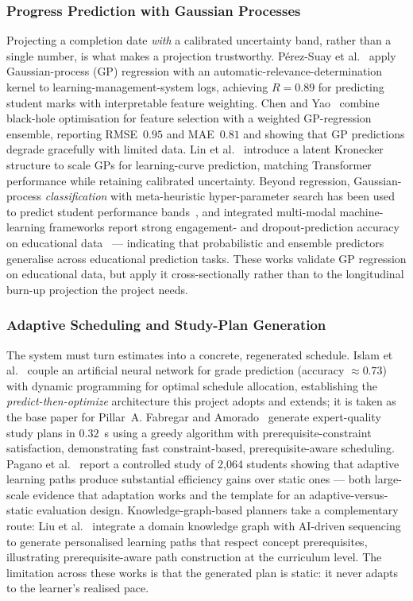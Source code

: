 \documentclass[12pt]{report}
\begin{document}
\subsubsection{Progress Prediction with Gaussian Processes}
Projecting a completion date \emph{with} a calibrated uncertainty band, rather than a
single number, is what makes a projection trustworthy. P\'erez-Suay et
al.~\cite{perezsuay2024} apply Gaussian-process (GP) regression with an
automatic-relevance-determination kernel to learning-management-system logs, achieving
$R = 0.89$ for predicting student marks with interpretable feature weighting. Chen and
Yao~\cite{chenyao2025} combine black-hole optimisation for feature selection with a
weighted GP-regression ensemble, reporting RMSE~$0.95$ and MAE~$0.81$ and showing that GP
predictions degrade gracefully with limited data. Lin et al.~\cite{lin2024} introduce a
latent Kronecker structure to scale GPs for learning-curve prediction, matching
Transformer performance while retaining calibrated uncertainty. Beyond regression,
Gaussian-process \emph{classification} with meta-heuristic hyper-parameter search has been
used to predict student performance bands~\cite{huang2025}, and integrated multi-modal
machine-learning frameworks report strong engagement- and dropout-prediction accuracy on
educational data~\cite{kayande2025} --- indicating that probabilistic and ensemble
predictors generalise across educational prediction tasks. These works validate GP
regression on educational data, but apply it cross-sectionally rather than to the
longitudinal burn-up projection the project needs.

\subsubsection{Adaptive Scheduling and Study-Plan Generation}
The system must turn estimates into a concrete, regenerated schedule. Islam et
al.~\cite{islam2024} couple an artificial neural network for grade prediction (accuracy
$\approx 0.73$) with dynamic programming for optimal schedule allocation, establishing the
\textit{predict-then-optimize} architecture this project adopts and extends; it is taken
as the base paper for Pillar~A. Fabregar and Amorado~\cite{fabregar2025} generate
expert-quality study plans in $0.32$~s using a greedy algorithm with prerequisite-constraint
satisfaction, demonstrating fast constraint-based, prerequisite-aware scheduling. Pagano
et al.~\cite{pagano2026} report a controlled study of 2{,}064 students showing that
adaptive learning paths produce substantial efficiency gains over static ones --- both
large-scale evidence that adaptation works and the template for an adaptive-versus-static
evaluation design. Knowledge-graph-based planners take a complementary route: Liu et
al.~\cite{liu2025} integrate a domain knowledge graph with AI-driven sequencing to generate
personalised learning paths that respect concept prerequisites, illustrating
prerequisite-aware path construction at the curriculum level. The limitation across these
works is that the generated plan is static: it never adapts to the learner's realised pace.
\end{document}
